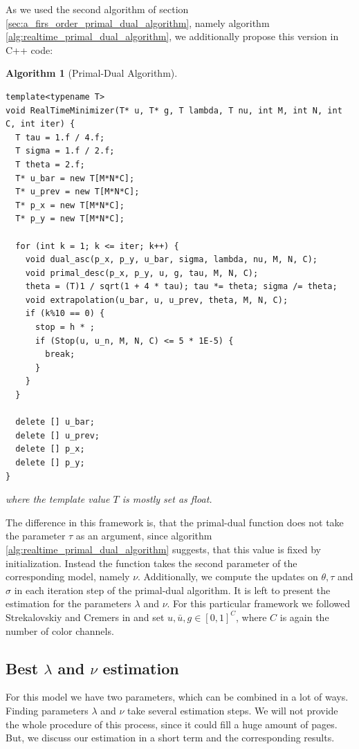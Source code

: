 \documentclass{scrreprt}
\newtheorem{algorithm}[theorem]{Algorithm}
\begin{document}
        As we used the second algorithm of section \ref{sec:a_firs_order_primal_dual_algorithm}, namely algorithm \ref{alg:realtime_primal_dual_algorithm}, we additionally propose this version in C++ code:

        \begin{algorithm}[Primal-Dual Algorithm]
        \label{alg:primal_dual_2}
            \begin{lstlisting}
template<typename T>
void RealTimeMinimizer(T* u, T* g, T lambda, T nu, int M, int N, int C, int iter) {
  T tau = 1.f / 4.f;
  T sigma = 1.f / 2.f;
  T theta = 2.f;
  T* u_bar = new T[M*N*C];
  T* u_prev = new T[M*N*C];
  T* p_x = new T[M*N*C];
  T* p_y = new T[M*N*C];

  for (int k = 1; k <= iter; k++) {
    void dual_asc(p_x, p_y, u_bar, sigma, lambda, nu, M, N, C);
    void primal_desc(p_x, p_y, u, g, tau, M, N, C);
    theta = (T)1 / sqrt(1 + 4 * tau); tau *= theta; sigma /= theta;
    void extrapolation(u_bar, u, u_prev, theta, M, N, C);
    if (k%10 == 0) {
      stop = h * ;
      if (Stop(u, u_n, M, N, C) <= 5 * 1E-5) {
        break;
      }
    }
  }

  delete [] u_bar;
  delete [] u_prev;
  delete [] p_x;
  delete [] p_y;
}
            \end{lstlisting}
            where the template value $T$ is mostly set as float.
        \end{algorithm}

        The difference in this framework is, that the primal-dual function does not take the parameter $\tau$ as an argument, since algorithm \ref{alg:realtime_primal_dual_algorithm} suggests, that this value is fixed by initialization. Instead the function takes the second parameter of the corresponding model, namely $\nu$. Additionally, we compute the updates on $\theta, \tau$ and $\sigma$ in each iteration step of the primal-dual algorithm. It is left to present the estimation for the parameters $\lambda$ and $\nu$. For this particular framework we followed Strekalovskiy and Cremers in \cite{Strekalovskiy-Cremers-eccv14} and set $u, \bar{u}, g \in [0,1]^{C}$, where $C$ is again the number of color channels.

        \subsection{Best $\lambda$ and $\nu$ estimation} %
        \label{sub:best_parameter_estimation_rt}
            
            For this model we have two parameters, which can be combined in a lot of ways. Finding parameters $\lambda$ and $\nu$ take several estimation steps. We will not provide the whole procedure of this process, since it could fill a huge amount of pages. But, we discuss our estimation in a short term and the corresponding results.
\end{document}
